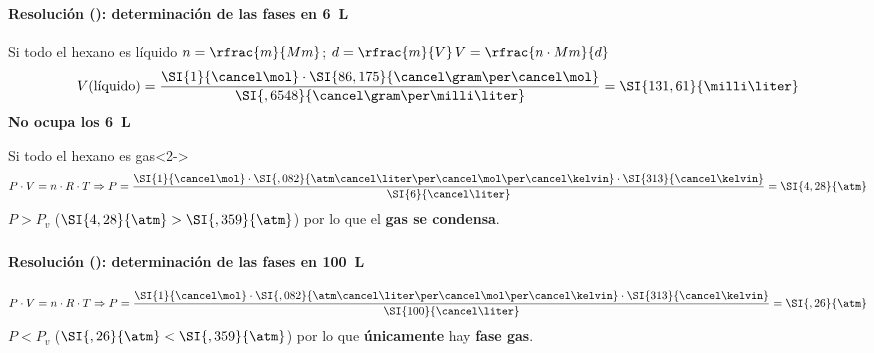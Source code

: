 \begin{frame}
	\frametitle{\ejerciciocmd}
	\framesubtitle{Resolución (): determinación de las fases en \SI{6}{\liter}}
	\begin{block}{Si todo el hexano es líquido}
		\centering$n=\rfrac{m}{Mm}$; $d=\rfrac{m}{V}$\ce{->}$V=\rfrac{n\cdot Mm}{d}$
		$$
			V(\text{líquido})=\frac{\SI{1}{\cancel\mol}\cdot\SI{86,175}{\cancel\gram\per\cancel\mol}}{\SI{,6548}{\cancel\gram\per\milli\liter}}=\SI{131,61}{\milli\liter}
		$$
		\centering\textbf{No ocupa los \SI{6}{\liter}}
	\end{block}
	\begin{alertblock}{Si todo el hexano es gas}<2->
		$$
			P\cdot V=n\cdot R\cdot T\Rightarrow P=\frac{\SI{1}{\cancel\mol}\cdot\SI{,082}{\atm\cancel\liter\per\cancel\mol\per\cancel\kelvin}\cdot\SI{313}{\cancel\kelvin}}{\SI{6}{\cancel\liter}}=\SI{4,28}{\atm}
		$$
		\centering$P>P_v$ ($\SI{4,28}{\atm}>\SI{,359}{\atm}$) por lo que el \textbf{gas se condensa}.
	\end{alertblock}
\end{frame}

\begin{frame}
	\frametitle{\ejerciciocmd}
	\framesubtitle{Resolución (): determinación de las fases en \SI{100}{\liter}}
	$$
		P\cdot V=n\cdot R\cdot T\Rightarrow P=\frac{\SI{1}{\cancel\mol}\cdot\SI{,082}{\atm\cancel\liter\per\cancel\mol\per\cancel\kelvin}\cdot\SI{313}{\cancel\kelvin}}{\SI{100}{\cancel\liter}}=\SI{,26}{\atm}
	$$
	\centering$P<P_v$ ($\SI{,26}{\atm}<\SI{,359}{\atm}$) por lo que \textbf{únicamente} hay \textbf{fase gas}.
\end{frame}
